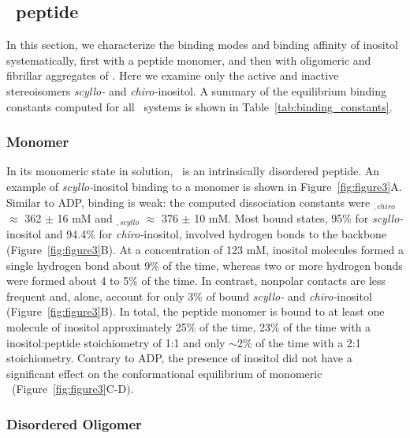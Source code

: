 \subsection{\gafour\ peptide}
In this section, we characterize the binding modes and binding affinity of inositol systematically, first with a peptide monomer, and then with oligomeric and fibrillar aggregates of \gafour. Here we examine only the active and inactive stereoisomers \textit{scyllo-} and \textit{chiro-}inositol. A summary of the equilibrium binding constants computed for all \gafour\ systems is shown in Table~\ref{tab:binding_constants}.

\subsubsection{Monomer}
In its monomeric state in solution, \gafour\ is an intrinsically disordered peptide.\cite{Nikolic:2011p57} An example of \textit{scyllo-}inositol binding to a monomer is shown in Figure~\ref{fig:figure3}A. Similar to ADP, binding is weak: the computed dissociation constants were \KD$_{,chiro}$  $\approx$ 362 $\pm$ 16 mM and \KD$_{,scyllo}$  $\approx$ 376 $\pm$ 10 mM. Most bound states, 95\% for \textit{scyllo-}inositol and 94.4\% for \textit{chiro-}inositol, involved hydrogen bonds to the backbone (Figure~\ref{fig:figure3}B). At a concentration of 123 mM, inositol molecules formed a single hydrogen bond about 9\% of the time, whereas two or more hydrogen bonds were formed about 4 to 5\% of the time. In contrast, nonpolar contacts are less frequent and, alone, account for only 3\% of bound \textit{scyllo-} and \textit{chiro-}inositol (Figure~\ref{fig:figure3}B). In total, the peptide monomer is bound to at least one molecule of inositol approximately 25\% of the time, 23\% of the time with a inositol:peptide stoichiometry of 1:1 and only $\sim$2\% of the time with a 2:1 stoichiometry. Contrary to ADP, the presence of inositol did not have a significant effect on the conformational equilibrium of monomeric \gafour\ (Figure~\ref{fig:figure3}C-D).

\subsubsection{Disordered Oligomer}

